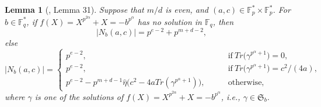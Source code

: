 \documentclass[final,1p,times]{elsarticle}
\newtheorem{sec3_lemma12}[sec3_lemma1x]{Lemma}
\begin{document}
   \begin{sec3_lemma12}[\cite{Bib7}, Lemma 31]\label{Nac_md_even}
          Suppose that $ m/d $ is even, and $ (a,c)\in \mathbb{F}_{p}^{*}\times\mathbb{F}_{p}^{*} $.  For $ b\in \mathbb{F}_{q}^{*}  $, if 
          $  f(X)=X^{p^{2\alpha}} +X=- b^{p^{\alpha}} $ has no solution in $ \mathbb{F}_{q} $, then 
          \begin{equation*}
          |N_{b}(a,c)|=p^{e-2}+p^{m+d-2},
          \end{equation*}
          else
          \begin{equation*}
          |N_{b}(a,c)|=
          \begin{cases}
          p^{e-2},&\qquad\text{if}\ Tr\bigl(\gamma^{p^{\alpha}+1}\bigr)=0,\\
          p^{e-2},&\qquad\text{if}\ Tr\bigl(\gamma^{p^{\alpha}+1}\bigr)=c^{2}/(4a),\\
          p^{e-2}-p^{m+d-1}\widehat{\eta}\bigl(c^{2}-4aTr(\gamma^{p^{\alpha}+1})\bigr),&\qquad\text{otherwise},
          \end{cases}
          \end{equation*}
          where $ \gamma $ is one of the  solutions of $ f(X)=X^{p^{2\alpha}} +X=- b^{p^{\alpha}} $, i.e., $ \gamma\in \mathfrak{S}_{b} $.
          \end{sec3_lemma12}
          
\end{document}
